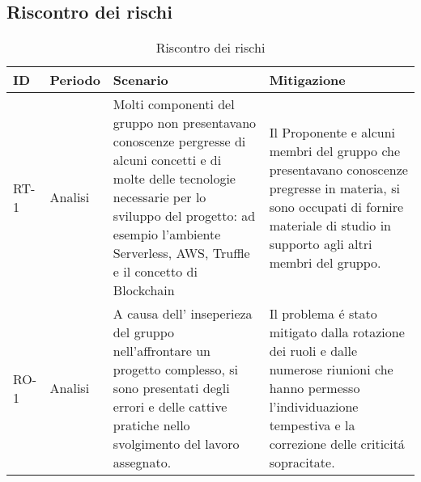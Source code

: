 \begin{appendices}
\section{Riscontro dei rischi}
	\begin{longtable}{
		>{\centering}p{}
		>{\centering}p{}
		>{\centering\arraybackslash}p{}
		>{\centering\arraybackslash}p{} }

		\caption {Riscontro dei rischi} \\

		\textbf{\color{white}ID} &
		\textbf{\color{white}Periodo} &
		\textbf{\color{white}Scenario} &
		\textbf{\color{white}Mitigazione}
		\tabularnewline
		\endhead

		RT-1
		&
		Analisi
		&
		Molti componenti del gruppo \Gruppo{} non presentavano conoscenze pergresse di alcuni concetti e di molte delle tecnologie necessarie per lo sviluppo del progetto: ad esempio l'ambiente Serverless, AWS, Truffle e il concetto di Blockchain
		&
		Il Proponente e alcuni membri del gruppo che presentavano conoscenze pregresse in materia, si sono occupati di fornire materiale di studio in supporto agli altri membri del gruppo.\\

		RO-1
		&
		Analisi
		&
		A causa dell' inseperieza del gruppo nell'affrontare un progetto complesso, si sono presentati degli errori e delle cattive pratiche nello svolgimento del lavoro assegnato.
		&
		Il problema é stato mitigato dalla rotazione dei ruoli e dalle numerose riunioni che hanno permesso l'individuazione tempestiva e la correzione delle criticitá sopracitate.\\

	\end{longtable}
\end{appendices}
